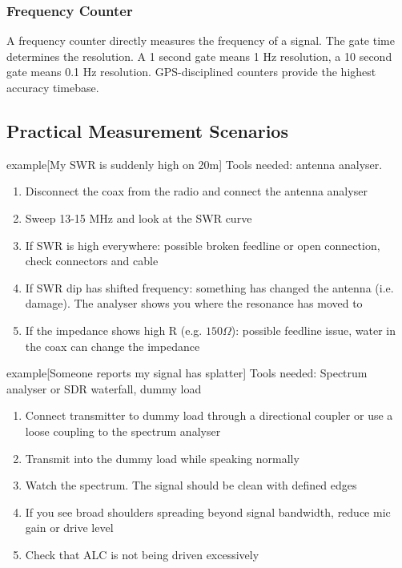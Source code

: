 \documentclass{article}
\begin{document}
\subsubsection{Frequency Counter}
A frequency counter directly measures the frequency of a signal. The gate time determines the resolution. A 1 second gate means 1 Hz resolution, a 10 second gate means 0.1 Hz resolution.  GPS-disciplined counters provide the highest accuracy timebase.

\subsection{Practical Measurement Scenarios}
\begin{callout}{example}[My SWR is suddenly high on 20m]
    Tools needed: antenna analyser.
    \begin{enumerate}
        \item Disconnect the coax from the radio and connect the antenna analyser
        \item Sweep 13-15 MHz and look at the SWR curve
        \item If SWR is high everywhere: possible broken feedline or open connection, check connectors and cable
        \item If SWR dip has shifted frequency: something has changed the antenna (i.e. damage). The analyser shows you where the resonance has moved to
        \item If the impedance shows high R (e.g. $150\Omega $): possible feedline issue, water in the coax can change the impedance
    \end{enumerate}
\end{callout}

\begin{callout}{example}[Someone reports my signal has splatter]
    Tools needed: Spectrum analyser or SDR waterfall, dummy load
    \begin{enumerate}
        \item Connect transmitter to dummy load through a directional coupler or use a loose coupling to the spectrum analyser
        \item Transmit into the dummy load while speaking normally
        \item Watch the spectrum. The signal should be clean with defined edges
        \item If you see broad shoulders spreading beyond signal bandwidth, reduce mic gain or drive level
        \item Check that ALC is not being driven excessively
    \end{enumerate}
\end{callout}
\end{document}

